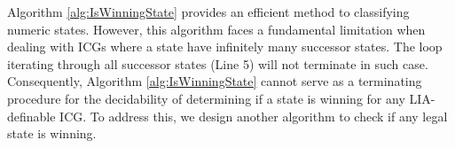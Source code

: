\documentclass[review]{elsarticle}
\newcommand{\tuple}[1]{\langle {#1} \rangle}
\newcommand{\true}{\top}
\newcommand{\false}{\bot}
\newcommand{\statevar}{\mathcal{X}}
\newcommand{\act}{\mathcal{A}}
\newcommand{\trans}{\mathcal{T}}
\newcommand{\constraint}{\mathcal{C}}
\newcommand{\estate}{\mathcal{E}}
\newcommand{\assign}{\leftarrow}
\begin{document}
    	
%    		
%    		
%    		
%    				
%    				
%    				
	
	Algorithm \ref{alg:IsWinningState} provides an efficient method to classifying numeric states.
	However, this algorithm faces a fundamental limitation when dealing with ICGs where a state have infinitely many successor states.
	The loop iterating through all successor states (Line 5) will not terminate in such case.
	Consequently, Algorithm \ref{alg:IsWinningState} cannot serve as a terminating procedure for the decidability of determining if a state is winning for any LIA-definable ICG.
	To address this, we design another algorithm to check if any legal state is winning.
	
\end{document}
